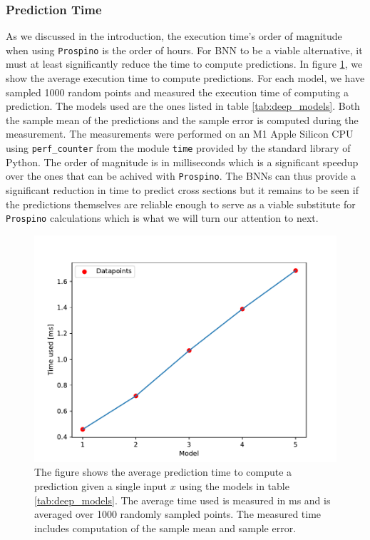 \subsubsection{Prediction Time}
As we discussed in the introduction, the execution time's order of magnitude when using {\tt Prospino} is the order of hours. For BNN to be a viable alternative, it must at least significantly reduce the time to compute predictions. In figure \ref{fig:prediction_time}, we 
show the average execution time to compute predictions. For each model, we have sampled 1000 random points and measured the execution time of computing a prediction. The models used are the ones listed in table \ref{tab:deep_models}. Both the sample mean of the predictions and the sample error is computed during the measurement. The measurements were performed on an M1 Apple Silicon CPU using {\tt perf\_counter} from the module {\tt time} provided by the standard library of Python. The order of magnitude is in milliseconds which is a significant speedup over the ones that can be achived with {\tt Prospino}. The BNNs can thus provide a significant reduction in time to predict cross sections but it remains to be seen if the predictions themselves are reliable enough to serve as a viable substitute for {\tt Prospino} calculations which is what we will turn our attention to next.

\begin{figure}
    \centering
    \includegraphics[scale=1]{figures/prediction_time/prediction_time.pdf}
    \caption{The figure shows the average prediction time to compute a prediction given a single input $x$ using the models in table \ref{tab:deep_models}. The average time used is measured in ms and is averaged over 1000 randomly sampled points. The measured time includes computation of the sample mean and sample error.
    }
    \label{fig:prediction_time}
\end{figure}

